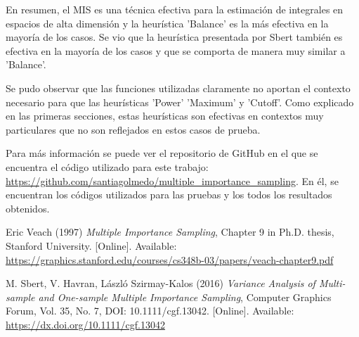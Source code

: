 \documentclass{article}
\begin{document}
En resumen, el MIS es una técnica efectiva para la estimación de integrales en espacios de alta dimensión y la heurística 'Balance' es la más efectiva en la mayoría de los casos.
Se vio que la heurística presentada por Sbert también es efectiva en la mayoría de los casos y que se comporta de manera muy similar a 'Balance'.

Se pudo observar que las funciones utilizadas claramente no aportan el contexto necesario para que las heurísticas 'Power' 'Maximum' y 'Cutoff'.
Como explicado en las primeras secciones, estas heurísticas son efectivas en contextos muy particulares que no son reflejados en estos casos de prueba.

Para más información se puede ver el repositorio de GitHub en el que se encuentra el código utilizado para este trabajo: \url{https://github.com/santiagolmedo/multiple_importance_sampling}.
En él, se encuentran los códigos utilizados para las pruebas y los todos los resultados obtenidos.

\begin{thebibliography}{99}

Eric Veach (1997) \emph{Multiple Importance Sampling}, Chapter 9 in Ph.D. thesis, Stanford University. [Online]. Available: \url{https://graphics.stanford.edu/courses/cs348b-03/papers/veach-chapter9.pdf}

M. Sbert, V. Havran, László Szirmay-Kalos (2016) \emph{Variance Analysis of Multi-sample and One-sample Multiple Importance Sampling}, Computer Graphics Forum, Vol. 35, No. 7, DOI: 10.1111/cgf.13042. [Online]. Available: \url{https://dx.doi.org/10.1111/cgf.13042}

\end{thebibliography}
\end{document}
